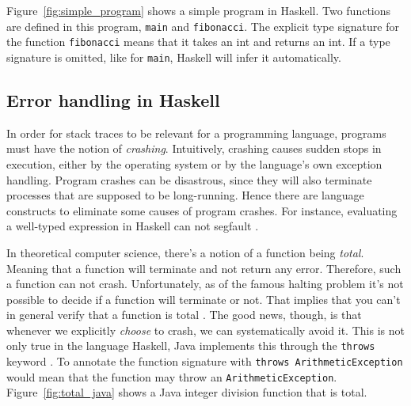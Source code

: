 Figure~\ref{fig:simple_program} shows a simple program in Haskell.
Two functions are defined in this program, \texttt{main} and
\texttt{fibonacci}.  The explicit type signature for the function
\texttt{fibonacci} means that it takes an int and returns an int. If a type
signature is omitted, like for \texttt{main}, Haskell will infer it automatically.

\subsection{Error handling in Haskell} \label{sec:error_handling_in_haskell}

In order for stack traces to be relevant for a programming language, programs
must have the notion of \emph{crashing}. Intuitively, crashing causes sudden
stops in execution, either by the operating system or by the language's own
exception handling. Program crashes can be disastrous, since they will also
terminate processes that are supposed to be long-running. Hence there are
language constructs to eliminate some causes of program crashes.
For instance,
evaluating a well-typed expression in Haskell can not segfault \cite{FindingTheNeedle2009}.

In theoretical computer science, there's a notion of a function being \emph{total}. Meaning
that a function will terminate and not return any error. Therefore,
such a function can not crash. Unfortunately, as of the famous halting
problem it's not possible to decide if a function will terminate or not.
That implies that you can't in general
verify that a function is total \cite[p.380]{Hopcroft:2000}.
The good news, though, is that whenever we
explicitly \emph{choose} to crash, we can systematically avoid it. This is not
only true in the language Haskell, Java implements this through the
\texttt{throws} keyword \cite{oracle_java_doc_method_throws}. 
To annotate the function signature with \texttt{throws ArithmeticException}
would mean that the function may throw an \texttt{ArithmeticException}.
Figure~\ref{fig:total_java} shows a Java integer division function that
is total.

